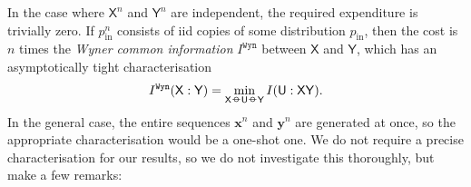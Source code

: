 \documentclass[10pt, a4paper]{article}
\numberwithin{equation}{section} %
\theoremstyle{definition}
\theoremstyle{plain}
\newcommand{\?}{\mathrel{?}} %
\newcommand{\cvec}[1]{\boldsymbol{\mathbf{#1}}}    %
\newcommand*\markov{\mathrel{\ooalign{\hidewidth$\circ$\hidewidth\cr$-$\cr}}} %
\newcommand{\crv}[1]{\mathsf{#1}}
\newcommand{\prin}[1][p]{#1_{\mathrm{in}}}
\begin{document}
    In the case where \(\crv{X}^n\) and \(\crv{Y}^n\) are independent, the required expenditure is trivially zero. If \(\prin^n\) consists of iid copies of some distribution \(\prin\), then the cost is \(n\) times the \emph{Wyner common information} \(I^{\mathtt{Wyn}}\) between \(\crv{X}\) and \(\crv{Y}\), which has an asymptotically tight characterisation~\cite[Thm V.3]{CorrReview}
    \begin{equation}
      I^{\mathtt{Wyn}}(\crv{X}:\crv{Y}) = \min_{\crv{X} \markov \crv{U} \markov \crv{Y}} I(\crv{U}:\crv{XY}).
    \end{equation}
    In the general case, the entire sequences \(\cvec{x}^n\) and \(\cvec{y}^n\) are generated at once, so the appropriate characterisation would be a one-shot one. We do not require a precise characterisation for our results, so we do not investigate this thoroughly, but make a few remarks:
\end{document}

